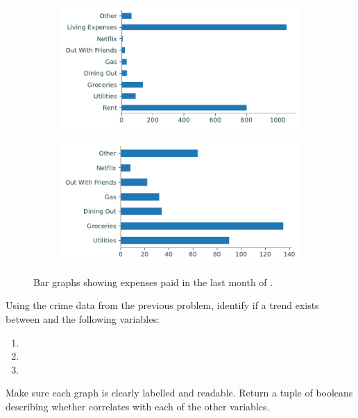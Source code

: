 \begin{figure}[H] %
\captionsetup[subfigure]{justification=centering}
\centering
\begin{subfigure}{.49\textwidth}
    \includegraphics[width=\textwidth]{figures/all_expenses.pdf}
\end{subfigure}
%
\begin{subfigure}{.49\textwidth}
    \includegraphics[width=\textwidth]{figures/some_expenses.pdf}
\end{subfigure}
\caption{Bar graphs showing expenses paid in the last month of .}
\end{figure}

\begin{problem}
Using the crime data from the previous problem, identify if a trend exists between  and the following variables:
\begin{enumerate}
\item {}
\item {}
\item {}
\end{enumerate}

Make sure each graph is clearly labelled and readable.
Return a tuple of booleans describing whether  correlates with each of the other variables.
\end{problem}

